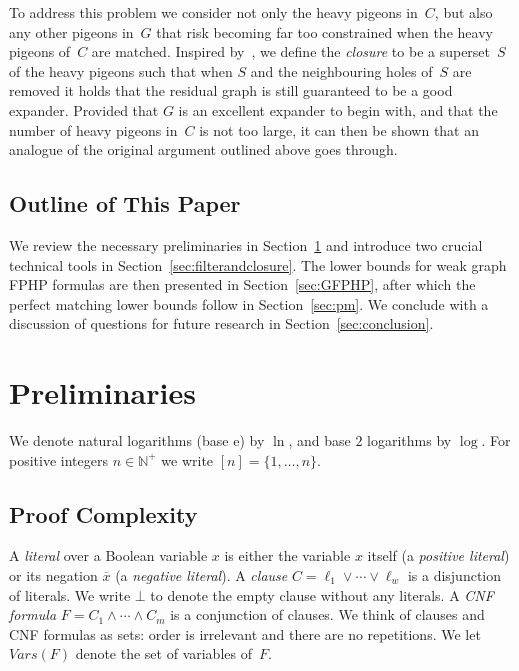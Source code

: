 \documentclass{article}
\newcommand{\formuladots}{\cdots}
\newcommand{\Nplus}     {\mathbb{N}^{+}}
\newcommand{\set}[1]{\{ #1 \}}
\newcommand{\olnot}[1]{\overline{#1}}
\newcommand{\introduceterm}[1]{{\emph{#1}}}
\newcommand{\refsec}[1]{Section~\ref{#1}}
\newcommand{\emptycl}{\bot}
\newcommand{\formf}{\ensuremath{F}}
\newcommand{\varx}{\ensuremath{x}}
\newcommand{\clc}{\ensuremath{C}}
\newcommand{\setsofvarsorlit}[2]{\mathit{#1}({#2})}
\newcommand{\vars}[1]{\setsofvarsorlit{Vars}{#1}}
\newcommand{\heavy}{heavy\xspace}
\newcommand{\squeezesubsection}[1]{\subsection{#1}}
\numberwithin{equation}{section}
\begin{document}
To address this problem we consider not only the \heavy pigeons
in~$\clc$, but also any other pigeons in~$G$ that risk becoming far too
constrained when the 
\heavy pigeons of~$\clc$ 
are matched.
Inspired by~\cite{ABRW04Pseudorandom,AR03LowerBounds},
we define the \introduceterm{closure} to be a
superset~$S$ of the \heavy pigeons such that when $S$ and the
neighbouring holes of~$S$ are removed it holds that the residual graph is
still guaranteed to be a good expander. Provided that $G$ is an
excellent expander to begin with, and that the number of
\heavy pigeons in~$\clc$ is not too large, it can then be shown that an
analogue of the original argument outlined above goes through.


\squeezesubsection{Outline of This Paper}

We review the necessary preliminaries in 
\refsec{sec:prelims}
and introduce two crucial technical tools in
\refsec{sec:filterandclosure}.
The lower bounds for weak graph FPHP formulas are then presented in
\refsec{sec:GFPHP},
after which the perfect matching lower bounds follow in
\refsec{sec:pm}.
We conclude with a discussion of questions for future research in
\refsec{sec:conclusion}.



 
\section{Preliminaries}
\label{sec:prelims}

We denote natural logarithms (base $\mathrm{e}$) by $\ln$, and base
$2$ logarithms by $\log$.  For positive integers $n \in \Nplus$ we
write $[n] = \set{1,\ldots,n}$.

\subsection{Proof Complexity}

A \introduceterm{literal} over a Boolean variable $\varx$ is either
the variable $\varx$ itself (a \introduceterm{positive literal}) or
its negation $\olnot{\varx}$ (a
\introduceterm{negative literal}).
A \introduceterm{clause}
$\clc = \ell_1 \lor \formuladots \lor \ell_{w}$ is a disjunction
of literals.
We write $\emptycl$ to denote the empty clause without any literals.
A \introduceterm{CNF formula}
$\formf = \clc_1 \land \formuladots \land \clc_m$ is a conjunction
of clauses.
We think of clauses and CNF formulas as sets:
order is irrelevant and there are no repetitions.
We let $\vars{\formf}$ denote the set of variables of~$\formf$.
\end{document}
